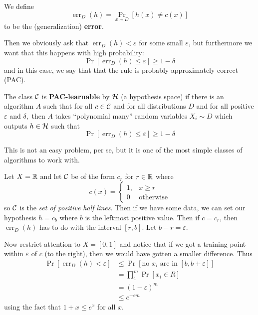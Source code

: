 \documentclass[12pt]{article}
\begin{document}
\begin{defn}
	We define 
	\[\operatorname{err}_D(h)=\Pr_{x\sim D}[h(x)\ne c(x)]\]
	to be the (generalization) \textbf{error}.
\end{defn}

Then we obviously ask that $\operatorname{err}_D(h)<\varepsilon$ for some small $\varepsilon$, but furthermore we want that 
this happens with high probability:
\[\Pr[\operatorname{err}_D(h)\le\varepsilon]\ge 1-\delta\]
and in this case, we say that that the rule is probably approximately correct  (PAC).
\begin{defn}
	The class $\mathcal{C}$ is \textbf{PAC-learnable} by $\mathcal{H}$ (a hypothesis space) if there is an algorithm $A$ such that
	for all $c\in\mathcal{C}$ and for all distributions $D$ and for all positive $\varepsilon$ and $\delta,$ then $A$ takes ``polynomial many''
	random variables $X_i\sim D$ which outputs $h\in\mathcal{H}$ such that
	\[\Pr[\operatorname{err}_D(h)\le\varepsilon]\ge 1-\delta\]
\end{defn}
\begin{rmk}
	This is not an easy problem, per se, but it is one of the most simple classes of algorithms to work with.
\end{rmk}
\begin{ex}
	Let $X=\mathbb{R}$ and let $\mathcal{C}$ be of the form $c_r$ for $r\in\mathbb{R}$ where 
	\[c(x)=\left\{\begin{array}{lr} 1, & x\ge r\\
	 0 & \text{otherwise}\end{array}\right.\]
	 so $\mathcal{C}$ is the \textit{set of positive half lines}. Then if we have some data, we can set our hypothesis 
	 $h=c_b$ where $b$ is the leftmost positive value. Then if $c=c_r$, then $\operatorname{err}_D(h)$ has to do with the interval $[r,b]$. Let $b-r=\varepsilon$.

	 Now restrict attention to $X=[0,1]$ and notice that if we got a training point within $\varepsilon$ of $c$ (to the right), then we would have gotten a smaller difference. Thus
	 \begin{align*}
		 \Pr[\operatorname{err}_D(h)<\varepsilon] &\le \Pr[\text{no $x_i$ are in $[b,b+\varepsilon]$}]\\
		 &=\prod_1^m\Pr[x_i\in R]\\
		 &=(1-\varepsilon)^m\\
		 &\le e^{-\varepsilon m}
	 \end{align*}
	 using the fact that $1+x\le e^x$ for all $x$.
\end{ex}
\end{document}
